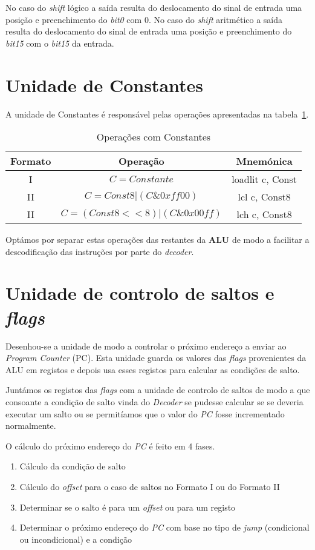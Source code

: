 No caso do \textit{shift} lógico a saída resulta do deslocamento do sinal de entrada uma posição e preenchimento do \textit{bit0} com 0. No caso do \textit{shift} aritmético a saída resulta do deslocamento do sinal de entrada uma posição e preenchimento do \textit{bit15} com o \textit{bit15} da entrada.\\

\section{Unidade de Constantes}
A unidade de Constantes é responsável pelas operações apresentadas na tabela~\ref{tabela:constantes}.
\begin{table}[h]
	\centering
	\begin{tabular}{|c|c|c|}
		\hline
		Formato & Operação & Mnemónica \\ \hline
		I & \mbox{$C=Constante$} & loadlit c, Const  \\ \hline
		II & \mbox{$C=Const8|(C\&0xff00)$}  & lcl c, Const8 \\ \hline
		II & \mbox{$C=(Const8<<8)|(C\&0x00ff)$}  & lch c, Const8 \\ \hline
	\end{tabular}
	\caption{Operações com Constantes}
	\label{tabela:constantes}
\end{table}

Optámos por separar estas operações das restantes da \textbf{ALU} de modo a facilitar a descodificação das instruções por parte do \textit{decoder}.

\section{Unidade de controlo de saltos e \textit{flags}}
Desenhou-se a unidade de modo a controlar o próximo endereço a enviar ao \textit{Program Counter} (PC). Esta unidade guarda os valores das \textit{flags} provenientes da ALU em registos e depois usa esses registos para calcular as condições de salto.\par
Juntámos os registos das \textit{flags} com a unidade de controlo de saltos de modo a que consoante a condição de salto vinda do \textit{Decoder} se pudesse calcular se se deveria executar um salto ou se permitíamos que o valor do \textit{PC} fosse incrementado normalmente.\par
O cálculo do próximo endereço do \textit{PC} é feito em 4 fases.
\begin{enumerate}
	\setlength{\itemindent}{25pt}
	\item Cálculo da condição de salto
	\item Cálculo do \textit{offset} para o caso de saltos no Formato I ou do Formato II
	\item Determinar se o salto é para um \textit{offset} ou para um registo
	\item Determinar o próximo endereço do \textit{PC} com base no tipo de \textit{jump} (condicional ou incondicional) e a condição
\end{enumerate}

